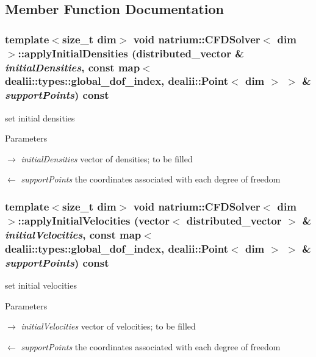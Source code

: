 \subsection{Member Function Documentation}
\hypertarget{classnatrium_1_1CFDSolver_a36146c0f8a6c5abd0ebec4c49f2a4e6d}{
\subsubsection[{applyInitialDensities}]{\setlength{\rightskip}{0pt plus 5cm}template$<$size\_\-t dim$>$ void {\bf natrium::CFDSolver}$<$ dim $>$::applyInitialDensities ({\bf distributed\_\-vector} \& {\em initialDensities}, \/  const map$<$ dealii::types::global\_\-dof\_\-index, dealii::Point$<$ dim $>$ $>$ \& {\em supportPoints}) const}}
\label{classnatrium_1_1CFDSolver_a36146c0f8a6c5abd0ebec4c49f2a4e6d}


set initial densities 
\begin{DoxyParams}{Parameters}
\item[\mbox{$\rightarrow$} {\em initialDensities}]vector of densities; to be filled \item[\mbox{$\leftarrow$} {\em supportPoints}]the coordinates associated with each degree of freedom \end{DoxyParams}
\hypertarget{classnatrium_1_1CFDSolver_afd82bfa5e1e613ef99b9b870cb73db0e}{
\subsubsection[{applyInitialVelocities}]{\setlength{\rightskip}{0pt plus 5cm}template$<$size\_\-t dim$>$ void {\bf natrium::CFDSolver}$<$ dim $>$::applyInitialVelocities (vector$<$ {\bf distributed\_\-vector} $>$ \& {\em initialVelocities}, \/  const map$<$ dealii::types::global\_\-dof\_\-index, dealii::Point$<$ dim $>$ $>$ \& {\em supportPoints}) const}}
\label{classnatrium_1_1CFDSolver_afd82bfa5e1e613ef99b9b870cb73db0e}


set initial velocities 
\begin{DoxyParams}{Parameters}
\item[\mbox{$\rightarrow$} {\em initialVelocities}]vector of velocities; to be filled \item[\mbox{$\leftarrow$} {\em supportPoints}]the coordinates associated with each degree of freedom \end{DoxyParams}


